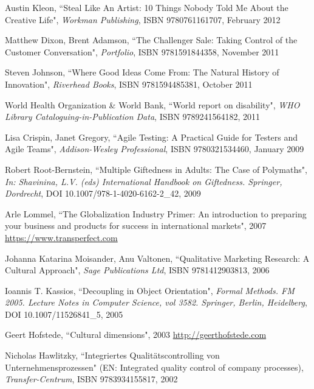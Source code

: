 \begin{thebibliography}{100}
 Austin Kleon, ``Steal Like An Artist: 10 Things Nobody Told Me About the Creative Life", 
\emph{Workman Publishing}, ISBN 9780761161707, February 2012

 Matthew Dixon, Brent Adamson, ``The Challenger Sale: Taking Control of the Customer 
Conversation", \emph{Portfolio}, ISBN 9781591844358, November 2011 

 Steven Johnson, ``Where Good Ideas Come From: The Natural History of Innovation",
\emph{Riverhead Books}, ISBN 9781594485381, October 2011

 World Health Organization \& World Bank, ``World report on disability",
\emph{WHO Library Cataloguing-in-Publication Data}, ISBN 9789241564182, 2011

 Lisa Crispin, Janet Gregory, ``Agile Testing: A Practical Guide for Testers and Agile 
Teams", \emph{Addison-Wesley Professional}, ISBN 9780321534460, January 2009

 Robert Root-Bernstein, ``Multiple Giftedness in Adults: The Case of Polymaths", 
\emph{In: Shavinina, L.V. (eds) International Handbook on Giftedness. Springer, Dordrecht}, 
DOI 10.1007/978-1-4020-6162-2\_42, 2009

 Arle Lommel, ``The Globalization Industry Primer: An introduction to preparing your
business and products for success in international markets", 2007
\href{https://marketing.transperfect.com/acton/attachment/687/f-0f09/1/-/-/-/-/lisa_globalization_primer.pdf}{https://www.transperfect.com}

 Johanna Katarina Moisander, Anu Valtonen, ``Qualitative Marketing Research: A 
Cultural Approach", \emph{Sage Publications Ltd}, ISBN 9781412903813, 2006

 Ioannis T. Kassios, ``Decoupling in Object Orientation", \emph{Formal Methods. FM 2005. 
Lecture Notes in Computer Science, vol 3582. Springer, Berlin, Heidelberg}, DOI 10.1007/11526841\_5, 2005

 Geert Hofstede, ``Cultural dimensions", 2003 \href{http://geerthofstede.com}{http://geerthofstede.com}

 Nicholas Hawlitzky, ``Integriertes Qualitätscontrolling von Unternehmensprozessen" (EN: 
Integrated quality control of company processes), \emph{Transfer-Centrum}, ISBN 9783934155817, 2002


\end{thebibliography}
